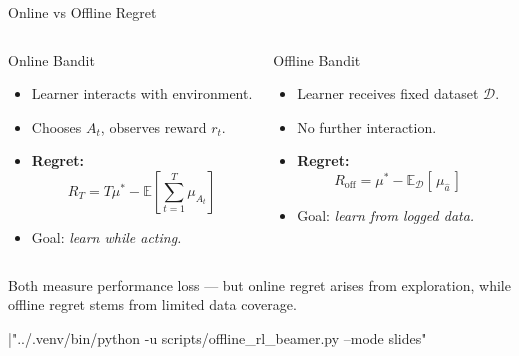 \documentclass[aspectratio=169]{beamer}
\providecommand{\buildmode}{slides}
\begin{document}
\begin{frame}{Online vs Offline Regret}

\begin{columns}[T,onlytextwidth]
\begin{block}{\centering Online Bandit}
\begin{itemize}
    \item Learner interacts with environment.
    \item Chooses $A_t$, observes reward $r_t$.
    \item \textbf{Regret:}
    \[
    R_T = T\mu^* - \mathbb{E}\!\left[\sum_{t=1}^T \mu_{A_t}\right]
    \]
    \item Goal: \textit{learn while acting.}
\end{itemize}
\end{block}

\begin{block}{\centering Offline Bandit}
\begin{itemize}
    \item Learner receives fixed dataset $\mathcal{D}$.
    \item No further interaction.
    \item \textbf{Regret:}
    \[
    R_{\text{off}} = \mu^* - \mathbb{E}_{\mathcal{D}}[\,\mu_{\hat{a}}\,]
    \]
    \item Goal: \textit{learn from logged data.}
\end{itemize}
\end{block}
\end{columns}

\vspace{0.8em}
\pause
\centering
\textcolor{gray!70}{Both measure performance loss — but online regret arises from exploration, while offline regret stems from limited data coverage.}

\end{frame}

|"../.venv/bin/python -u scripts/offline_rl_beamer.py --mode \buildmode"
\end{document}
